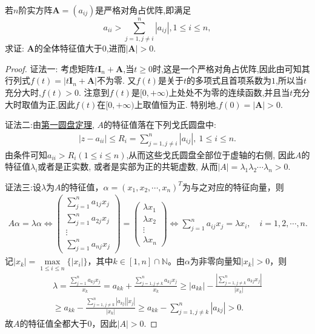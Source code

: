 \documentclass[../../main.tex]{subfiles}%
\begin{document}
\begin{proposition}\label{proposition:更严格对角占优阵行列式必大于零}
若\(n\)阶实方阵\(\boldsymbol{A}=(a_{ij})\)是严格对角占优阵,即满足
\[
a_{ii}>\sum_{j = 1,j\neq i}^{n}|a_{ij}|,1\leqslant  i\leqslant  n,
\]
求证: $\boldsymbol{A}$的全体特征值大于0,进而\(|\boldsymbol{A}|>0\).
\end{proposition}
\begin{proof}

{\color{blue}证法一:}
考虑矩阵\(t\boldsymbol{I}_n+\boldsymbol{A}\),当\(t\geqslant 0\)时,这是一个严格对角占优阵,因此由可知其行列式\(f(t)=|t\boldsymbol{I}_n+\boldsymbol{A}|\)不为零. 又\(f(t)\)是关于\(t\)的多项式且首项系数为\(1\),所以当\(t\)充分大时,\(f(t)>0\). 注意到\(f(t)\)是\([0,+\infty)\)上处处不为零的连续函数,并且当\(t\)充分大时取值为正,因此\(f(t)\)在\([0,+\infty)\)上取值恒为正. 特别地,\(f(0)=|\boldsymbol{A}|>0\).

{\color{blue}证法二:}由\hyperref[theorem:第一圆盘定理]{第一圆盘定理}, \(A\)的特征值落在下列戈氏圆盘中:
\begin{align*}
|z - a_{ii}| \leqslant  R_{i} = \sum_{j = 1,j\neq i}^{n}|a_{ij}|,\ 1 \leqslant  i \leqslant  n.
\end{align*}
由条件可知\(a_{ii} > R_{i}(1 \leqslant  i \leqslant  n)\),从而这些戈氏圆盘全部位于虚轴的右侧, 因此\(A\)的特征值\(\lambda_{i}\)或者是正实数, 或者是实部为正的共轭虚数, 从而\(|A|=\lambda_{1}\lambda_{2}\cdots\lambda_{n}>0\). 

{\color{blue}证法三:}设$\lambda$为$A$的特征值，$\alpha=(x_1,x_2,\cdots,x_n)^T$为与之对应的特征向量，则
\begin{align*}
A\alpha = \lambda\alpha \Longleftrightarrow \begin{pmatrix}
\sum_{j=1}^n a_{1j}x_j \\
\sum_{j=1}^n a_{2j}x_j \\
\vdots \\
\sum_{j=1}^n a_{nj}x_j
\end{pmatrix} = \begin{pmatrix}
\lambda x_1 \\
\lambda x_2 \\
\vdots \\
\lambda x_n
\end{pmatrix} \Longleftrightarrow \sum_{j=1}^n a_{ij}x_j = \lambda x_i,\quad i=1,2,\cdots,n.
\end{align*}
记$|x_k| = \max\limits_{1\leqslant i\leqslant n}\{|x_i|\}$，其中$k\in[1,n]\cap\mathbb{N}$。由$\alpha$为非零向量知$|x_k|>0$，则
\begin{align*}
\lambda = \frac{\sum\limits_{j=1}^n a_{kj}x_j}{x_k} = a_{kk} + \frac{\sum\limits_{j=1,j\ne k}^n a_{kj}x_j}{x_k} \geqslant |a_{kk}| - \frac{\left|\sum\limits_{j=1,j\ne k}^n a_{kj}x_j\right|}{|x_k|} \\
\geqslant a_{kk} - \frac{\sum\limits_{j=1,j\ne k}^n |a_{kj}||x_j|}{|x_k|} \geqslant a_{kk} - \sum\limits_{j=1,j\ne k}^n |a_{kj}| > 0.
\end{align*}
故$A$的特征值全都大于$0$，因此$|A|>0$.

\end{proof}
\end{document}
